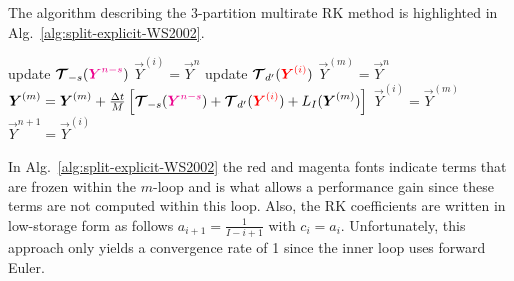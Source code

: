 \documentclass{report}
\begin{document}
The algorithm describing the 3-partition multirate RK method is highlighted in Alg.\ \ref{alg:split-explicit-WS2002}.
\begin{algorithm}
\label{alg:split-explicit-WS2002}
\begin{algorithmic}
\State
{}
\State update $\boldsymbol{{\mathcal{T}}}_{-s}(\textcolor{magenta}{ \boldsymbol{{Y}}^{n-s}})$
\State $\vec{Y}^{(i)}=\vec{Y}^n$ 
\State update $\boldsymbol{{\mathcal{T}}}_{d'}(\textcolor{red}{ \boldsymbol{{Y}}^{(i)} })$
\State $\vec{Y}^{(m)}=\vec{Y}^{n}$ 
\State $\boldsymbol{{Y}}^{(m)}=\boldsymbol{{Y}}^{(m)} + \frac{\Delta t}{M} \left[ \boldsymbol{{\mathcal{T}}}_{-s}(\textcolor{magenta}{ \boldsymbol{{Y}}^{n-s} }) + \boldsymbol{{\mathcal{T}}}_{d'}(\textcolor{red}{ \boldsymbol{{Y}}^{(i)}}) + L_I(\boldsymbol{{Y}}^{(m)}) \right]$
\EndFor %
\State $\vec{Y}^{(i)}=\vec{Y}^{(m)}$
\EndFor %
\State $\vec{Y}^{n+1}=\vec{Y}^{(i)}$
\EndFunction
\end{algorithmic}
\end{algorithm}
In Alg.\ \ref{alg:split-explicit-WS2002} the red and magenta fonts indicate terms that are frozen within the $m$-loop and is what allows a performance gain since these terms are not computed within this loop. Also, 
the RK coefficients are written in low-storage form as follows $a_{i+1}=\frac{1}{I-i+1}$ with $c_i=a_i$. Unfortunately, this approach only yields a convergence rate of 1 since the inner loop uses forward Euler.
\end{document}
